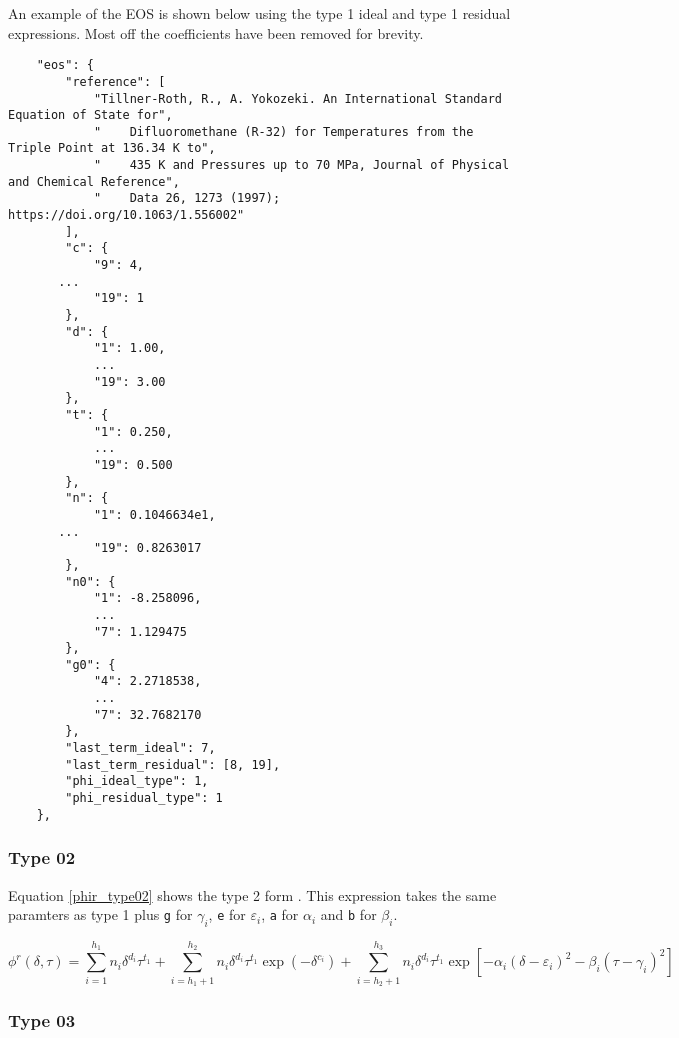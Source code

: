 \documentclass[oneside]{book}
\begin{document}
An example of the EOS is shown below using the type 1 ideal and type 1 residual expressions.  Most off the coefficients have been removed for brevity.   

\begin{verbatim}
    "eos": {
        "reference": [
            "Tillner-Roth, R., A. Yokozeki. An International Standard Equation of State for",
            "    Difluoromethane (R-32) for Temperatures from the Triple Point at 136.34 K to",
            "    435 K and Pressures up to 70 MPa, Journal of Physical and Chemical Reference",
            "    Data 26, 1273 (1997); https://doi.org/10.1063/1.556002"
        ],
        "c": {
            "9": 4,
	   ...
            "19": 1
        },
        "d": {
            "1": 1.00,
            ...
            "19": 3.00
        },
        "t": {
            "1": 0.250,
            ... 
            "19": 0.500
        },
        "n": {
            "1": 0.1046634e1,
	   ...
            "19": 0.8263017
        },
        "n0": {
            "1": -8.258096,
            ...
            "7": 1.129475
        },
        "g0": {
            "4": 2.2718538,
            ...
            "7": 32.7682170
        },
        "last_term_ideal": 7,
        "last_term_residual": [8, 19],
        "phi_ideal_type": 1,
        "phi_residual_type": 1
    },
\end{verbatim}

\subsubsection{Type 02}

Equation \ref{phir_type02} shows the type 2 form \cite{osti_402357}.  This expression takes the same paramters as type 1 plus \texttt{g} for $\gamma_i$, \texttt{e} for $\varepsilon_i$, \texttt{a} for $\alpha_i$ and \texttt{b} for $\beta_i$.

\begin{equation}\label{phir_type02}
	\phi^r(\delta, \tau) = \sum^{h_1}_{i=1} n_i \delta^{d_i} \tau^{t_1} + 
	\sum_{i =h_1 + 1}^{h_2} n_i \delta^{d_i} \tau^{t_1} \exp(-\delta^{c_i}) + 
	\sum_{i = h_2 + 1}^{h_3} n_i \delta^{d_i} \tau^{t_1} \exp\left[-\alpha_i(\delta - \varepsilon_i)^2 - \beta_i(\tau - \gamma_i)^2 \right]
\end{equation}

\subsubsection{Type 03}
\end{document}
